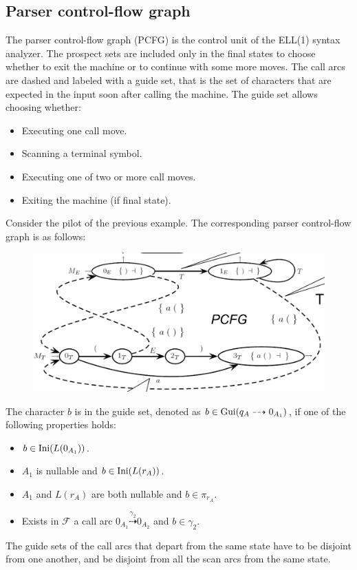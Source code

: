 \subsection*{Parser control-flow graph}
The parser control-flow graph (PCFG) is the control unit of the ELL(1) syntax analyzer. 
The prospect sets are included only in the final states to choose whether to exit the machine or to continue with some more moves. 
The call arcs are dashed and labeled with a guide set, that is the set of characters that are expected in the input soon after calling the machine. 
The guide set allows choosing whether: 
\begin{itemize}
    \item Executing one call move. 
    \item Scanning a terminal symbol. 
    \item Executing one of two or more call moves. 
    \item Exiting the machine (if final state).
\end{itemize}
\begin{example}
    Consider the pilot of the previous example. 
    The corresponding parser control-flow graph is as follows: 
    \begin{figure}[H]
        \centering
        \includegraphics[width=0.6\linewidth]{images/pcfg.png}
    \end{figure}
\end{example}

The character $b$ is in the guide set, denoted as $b \in \textnormal{Gui}(q_A \dashrightarrow 0_{A_1})$, if one of the following properties holds:  
\begin{itemize}
    \item $b \in \textnormal{Ini}(L(0_{A_1}))$. 
    \item $A_1$ is nullable and $b \in \textnormal{Ini}(L(r_A))$. 
    \item $A_1$ and $L(r_A)$ are both nullable and $b \in \pi_{r_A}$.
    \item Exists in $\mathcal{F}$ a call arc $0_{A_1} \overset{\gamma_2}{\dashrightarrow} 0_{A_2}$ and $b \in \gamma_2$. 
\end{itemize}
The guide sets of the call arcs that depart from the same state have to be disjoint from one another, and be disjoint from all the scan arcs from the same state. 

